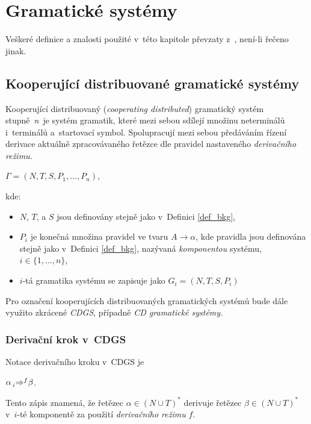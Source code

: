 \cleardoublepage

\chapter{Gramatické systémy}\label{kap_GS}
Veškeré definice a znalosti použité v~této kapitole převzaty z~\cite{CDGS, PCGS, Handbook-Of-Formal-Languages-2}, není-li řečeno jinak.

\section{Kooperující distribuované gramatické systémy}\label{kap_CDGS}

Kooperující distribuovaný (\emph{cooperating distributed}) gramatický systém stupně~\emph{n}~je systém gramatik, které mezi sebou sdílejí množinu neterminálů i~terminálů a~startovací symbol.
Spolupracují mezi sebou předáváním řízení derivace aktuálně zpracovávaného řetězce dle pravidel nastaveného \emph{derivačního režimu}.

\begin{definition}\label{def_cdgs}
\begin{center}
    $\Gamma = (N, T, S, P_1, \ldots ,P_n)$,
\end{center}
kde:
\begin{itemize}
    \item $N$, $T$, a $S$ jsou definovány stejně jako v~Definici \ref{def_bkg},
    \item $P_i$ je konečná množina pravidel ve tvaru $A\rightarrow \alpha$, kde pravidla jsou definována stejně jako v~Definici \ref{def_bkg}, nazývaná \emph{komponentou} systému, $i \in \{1, \ldots, n\}$,
    \item $i$-tá gramatika systému se zapisuje jako $G_i = (N,T,S,P_i)$
\end{itemize}   
\end{definition}

\begin{convention}
    Pro označení kooperujících distribuovaných gramatických systémů bude dále využito zkrácené \emph{CDGS}, případně \emph{CD gramatické systémy}.
\end{convention}

\subsection*{Derivační krok v~CDGS}
Notace derivačního kroku v~CDGS je
\begin{center}
    $\alpha \prescript{}{i}{\Rightarrow}^{f} \beta$.
\end{center}
Tento zápis znamená, že řetězec $\alpha \in (N \cup T)^{*}$ derivuje řetězec $\beta \in (N \cup T)^{*}$ v~$i$-té komponentě za použití \emph{derivačního režimu} $f$.

